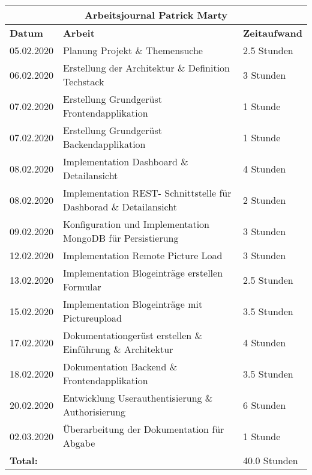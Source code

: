 \documentclass[../main.tex]{subfiles}
\begin{document}
\begin{tabular}{ |p{3cm}| p{11cm}| p{3cm} |}
 \hline
 \multicolumn{3}{|c|}{Arbeitsjournal Patrick Marty} \\
 \hline
 \textbf{Datum} & \textbf{Arbeit} & \textbf{Zeitaufwand}\\
 \hline
 05.02.2020 &   Planung Projekt \& Themensuche                       & 2.5 Stunden\\ \hline
 06.02.2020 &   Erstellung der Architektur \& Definition Techstack  & 3 Stunden \\ \hline
 07.02.2020 &   Erstellung Grundgerüst Frontendapplikation          & 1 Stunde \\ \hline
 07.02.2020 &   Erstellung Grundgerüst Backendapplikation           & 1 Stunde \\ \hline
 08.02.2020 &   Implementation Dashboard \& Detailansicht           & 4 Stunden \\ \hline
 08.02.2020 &   Implementation REST- Schnittstelle für Dashborad \& Detailansicht & 2 Stunden \\ \hline
 09.02.2020 &   Konfiguration und Implementation MongoDB für Persistierung  & 3 Stunden \\ \hline
 12.02.2020 &   Implementation Remote Picture Load                  & 3 Stunden \\ \hline 
 13.02.2020 &   Implementation Blogeinträge erstellen Formular      & 2.5 Stunden \\ \hline
 15.02.2020 &   Implementation Blogeinträge mit Pictureupload       & 3.5 Stunden \\ \hline
 17.02.2020 &   Dokumentationgerüst erstellen \& Einführung \& Architektur  & 4 Stunden \\ \hline
 18.02.2020 &   Dokumentation Backend \& Frontendapplikation                & 3.5 Stunden \\ \hline
 20.02.2020 &   Entwicklung Userauthentisierung \& Authorisierung           & 6 Stunden \\ \hline
 02.03.2020 &   Überarbeitung der Dokumentation für Abgabe            & 1 Stunde  \\ \hline
 \hline
 \textbf{Total:} & & 40.0 Stunden \\ \hline
 
\end{tabular}
\end{document}
